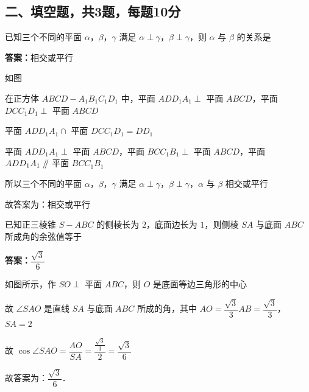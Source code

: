 \vspace{2em}

\subsection{二、填空题，共3题，每题10分}

\begin{example}[\bkstar{2}{5}]
已知三个不同的平面 $\alpha$，$\beta$，$\gamma$ 满足 $\alpha\perp\gamma$，$\beta\perp\gamma$，则 $\alpha$ 与 $\beta$ 的关系是
\end{example}
\begin{solution}
\textbf{答案：}相交或平行

如图

在正方体 $ABCD-A_1B_1C_1D_1$ 中，平面 $ADD_1A_1\perp$ 平面 $ABCD$，平面 $DCC_1D_1\perp$ 平面 $ABCD$

平面 $ADD_1A_1\cap$ 平面 $DCC_1D_1=DD_1$

平面 $ADD_1A_1\perp$ 平面 $ABCD$，平面 $BCC_1B_1\perp$ 平面 $ABCD$，平面 $ADD_1A_1\mathrel{/\mkern-5mu/}$ 平面 $BCC_1B_1$

所以三个不同的平面 $\alpha$，$\beta$，$\gamma$ 满足 $\alpha\perp\gamma$，$\beta\perp\gamma$，$\alpha$ 与 $\beta$ 相交或平行

故答案为：相交或平行
\end{solution}

\vspace{2em}

\begin{example}[\bkstar{2}{5}]
已知正三棱锥 $S-ABC$ 的侧棱长为 $2$，底面边长为 $1$，则侧棱 $SA$ 与底面 $ABC$ 所成角的余弦值等于
\end{example}
\begin{solution}
\textbf{答案：}$\dfrac{\sqrt{3}}{6}$

如图所示，作 $SO\perp$ 平面 $ABC$，则 $O$ 是底面等边三角形的中心

故 $\angle SAO$ 是直线 $SA$ 与底面 $ABC$ 所成的角，其中 $AO=\dfrac{\sqrt{3}}{3}AB=\dfrac{\sqrt{3}}{3}$，$SA=2$

故 $\cos\angle SAO=\dfrac{AO}{SA}=\dfrac{\frac{\sqrt{3}}{3}}{2}=\dfrac{\sqrt{3}}{6}$

故答案为：$\dfrac{\sqrt{3}}{6}$．
\end{solution}

\vspace{2em}

